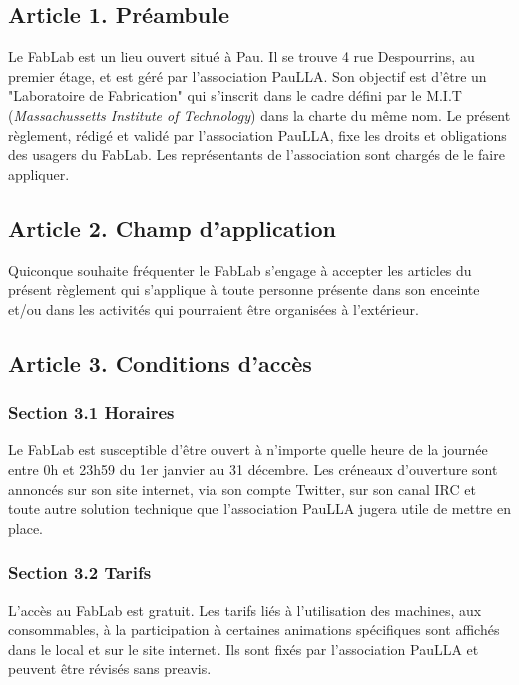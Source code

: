 
\subsection*{Article 1. Préambule}
Le FabLab est un lieu ouvert situé à Pau. Il se trouve 4 rue Despourrins, au premier étage, et est géré par l'association PauLLA. Son objectif est d'être un "Laboratoire de Fabrication" qui s'inscrit dans le cadre défini par le M.I.T (\textit{Massachussetts Institute of Technology}) dans la charte du même nom.
Le présent règlement, rédigé et validé par l'association PauLLA, fixe les droits et obligations des usagers du FabLab. Les représentants de l'association sont chargés de le faire appliquer.

\subsection*{Article 2. Champ d'application}
Quiconque souhaite fréquenter le FabLab s'engage à accepter les articles du présent règlement qui s'applique à toute personne présente dans son enceinte et/ou dans les activités qui pourraient être organisées à l'extérieur.

\subsection*{Article 3. Conditions d'accès}
\subsubsection*{Section 3.1 Horaires}
Le FabLab est susceptible d'être ouvert à n'importe quelle heure de la journée entre 0h et 23h59 du 1er janvier au 31 décembre. Les créneaux d'ouverture sont annoncés sur son site internet, via son compte Twitter, sur son canal IRC et toute autre solution technique que l'association PauLLA jugera utile de mettre en place.
\subsubsection*{Section 3.2 Tarifs}
L'accès au FabLab est gratuit. Les tarifs liés à l'utilisation des machines, aux consommables, à la participation à certaines animations spécifiques sont affichés dans le local et sur le site internet. Ils sont fixés par l'association PauLLA et peuvent être révisés sans preavis.
